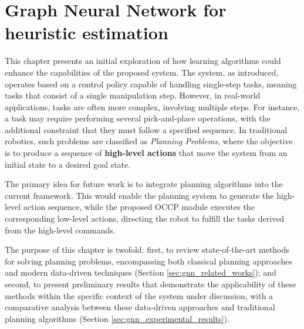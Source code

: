 \chapter{Graph Neural Network for heuristic estimation}
\label{ch:gnn_planning_systems}
This chapter presents an initial exploration of how learning algorithms could enhance the capabilities of the proposed system. The system, as introduced, operates based on a control policy capable of handling single-step tasks, meaning tasks that consist of a single manipulation step. However, in real-world applications, tasks are often more complex, involving multiple steps. For instance, a task may require performing several pick-and-place operations, with the additional constraint that they must follow a specified sequence. In traditional robotics, such problems are classified as \textit{Planning Problems}, where the objective is to produce a sequence of \textbf{high-level actions} that move the system from an initial state to a desired goal state. 

The primary idea for future work is to integrate planning algorithms into the current framework. This would enable the planning system to generate the high-level action sequence, while the proposed OCCP module executes the corresponding low-level actions, directing the robot to fulfill the tasks derived from the high-level commands.

The purpose of this chapter is twofold: first, to review state-of-the-art methods for solving planning problems, encompassing both classical planning approaches and modern data-driven techniques (Section \ref{sec:gnn_related_works}); and second, to present preliminary results that demonstrate the applicability of these methods within the specific context of the system under discussion, with a comparative analysis between these data-driven approaches and traditional planning algorithms (Section \ref{sec:gnn_experimental_results}).




